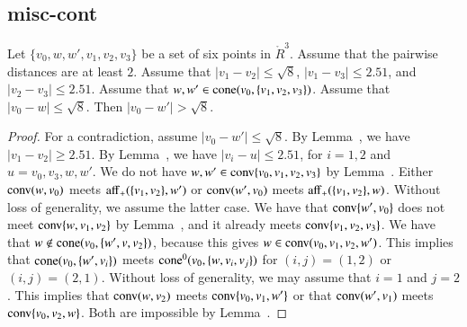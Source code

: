 \newpage

\subsection{misc-cont}



\begin{lemma} 
Let $\{v_0,w,w',v_1,v_2,v_3\}$ be a set of six points in
$\ring{R}^3$.  Assume that the pairwise distances are at least
$2$.  Assume that  $|v_1-v_2|\le\sqrt8$,
$|v_1-v_3|\le 2.51$, and $|v_2-v_3|\le 2.51$.
Assume that $w,w'\in{\operatorname{cone}}(v_0,\{v_1,v_2,v_3\})$.
Assume that $|v_0-w|\le\sqrt8$.  Then $|v_0-w'| > \sqrt8$.
\end{lemma}

\begin{proof}
For a contradiction, assume $|v_0-w'|\le\sqrt8$.  By
Lemma~, we have $|v_1-v_2|\ge 2.51$.
By Lemma~,\FIXX{$\CalE$}
we have $|v_i-u|\le 2.51$, for
$i=1,2$ and $u=v_0,v_3,w,w'$.  
We do not have $w,w'\in{\operatorname{conv}}\{v_0,v_1,v_2,v_3\}$ by Lemma~.  Either 
${\operatorname{conv}}(w,v_0)$ meets ${\operatorname{aff}}_+(\{v_1,v_2\},w')$ or
${\operatorname{conv}}(w',v_0)$ meets ${\operatorname{aff}}_+(\{v_1,v_2\},w)$.
Without loss of generality, we assume the latter case.
We have that ${\operatorname{conv}}\{w',v_0\}$ does not meet ${\operatorname{conv}}\{w,v_1,v_2\}$
by Lemma~,%
and it already meets ${\operatorname{conv}}\{v_1,v_2,v_3\}$.
We have that $w\not\in{\operatorname{cone}}(v_0,\{w',v,v_2\})$, because this
gives $w\in {\operatorname{conv}}(v_0,v_1,v_2,w')$.  This implies that
${\operatorname{cone}}(v_0,\{w',v_i\})$ meets ${\operatorname{cone}}^0(v_0,\{w,v_i,v_j\})$
for $(i,j)=(1,2)$ or $(i,j)=(2,1)$.  Without loss of generality,
we may assume that $i=1$ and $j=2$.   This implies that
${\operatorname{conv}}(w,v_2)$ meets ${\operatorname{conv}}\{v_0,v_1,w'\}$ or that
${\operatorname{conv}}(w',v_1)$ meets ${\operatorname{conv}}\{v_0,v_2,w\}$.  Both
are impossible by Lemma~.\FIXX{$\CalE$}
%
\end{proof}



